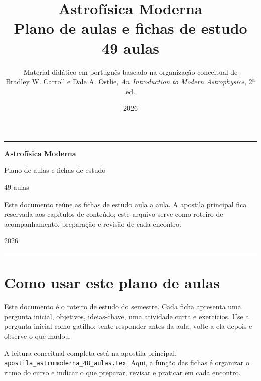 \documentclass[11pt,a4paper]{article}
\title{\textbf{Astrofísica Moderna}\\Plano de aulas e fichas de estudo\\49 aulas}
\author{Material didático em português baseado na organização conceitual de\\Bradley W. Carroll e Dale A. Ostlie, \textit{An Introduction to Modern Astrophysics}, 2ª ed.}
\date{2026}
\begin{document}
\begin{titlepage}
\thispagestyle{empty}
\vspace*{0.8cm}
{\color{astroGold}\rule{\textwidth}{1.2pt}}\par
\vspace{1.0cm}
{\fontsize{32}{36}\selectfont\bfseries\color{astroNavy} Astrofísica Moderna\par}
\vspace{0.35cm}
{\Large\color{astroBlue} Plano de aulas e fichas de estudo\par}
{\large\color{astroMuted} 49 aulas\par}
\vfill
\begin{noticebox}
Este documento reúne as fichas de estudo aula a aula. A apostila principal fica reservada aos capítulos de conteúdo; este arquivo serve como roteiro de acompanhamento, preparação e revisão de cada encontro.
\end{noticebox}
\vfill
{\color{astroMuted}2026\par}
\vspace{0.6cm}
{\color{astroGold}\rule{0.38\textwidth}{1.2pt}}\par
\end{titlepage}

\tableofcontents
\newpage
{}

\section*{Como usar este plano de aulas}
Este documento é o roteiro de estudo do semestre. Cada ficha apresenta uma pergunta inicial, objetivos, ideias-chave, uma atividade curta e exercícios. Use a pergunta inicial como gatilho: tente responder antes da aula, volte a ela depois e observe o que mudou.

A leitura conceitual completa está na apostila principal, \texttt{apostila\_astromoderna\_48\_aulas.tex}. Aqui, a função das fichas é organizar o ritmo do curso e indicar o que preparar, revisar e praticar em cada encontro.
\end{document}
